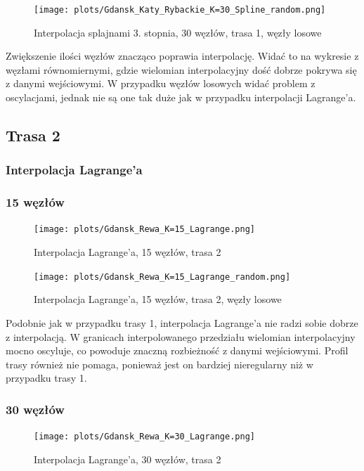 \documentclass{article}
\begin{document}
\begin{figure}[H]
    \centering
    \texttt{[image: plots/Gdansk\_Katy\_Rybackie\_K=30\_Spline\_random.png]}
    \caption{Interpolacja splajnami 3. stopnia, 30 węzłów, trasa 1, węzły losowe}
\end{figure}

Zwiększenie ilości węzłów znacząco poprawia interpolację. Widać to na wykresie z węzłami równomiernymi,
gdzie wielomian interpolacyjny dość dobrze pokrywa się z danymi wejściowymi. W przypadku węzłów losowych
widać problem z oscylacjami, jednak nie są one tak duże jak w przypadku interpolacji Lagrange'a.


\subsection{Trasa 2}

\subsubsection{Interpolacja Lagrange'a}

\subsubsection*{\hfil 15 węzłów \hfil }

\begin{figure}[H]
    \centering
    \texttt{[image: plots/Gdansk\_Rewa\_K=15\_Lagrange.png]}
    \caption{Interpolacja Lagrange'a, 15 węzłów, trasa 2}
\end{figure}

\begin{figure}[H]
    \centering
    \texttt{[image: plots/Gdansk\_Rewa\_K=15\_Lagrange\_random.png]}
    \caption{Interpolacja Lagrange'a, 15 węzłów, trasa 2, węzły losowe}
\end{figure}

Podobnie jak w przypadku trasy 1, interpolacja Lagrange'a nie radzi sobie dobrze z interpolacją.
W granicach interpolowanego przedziału wielomian interpolacyjny mocno oscyluje, co powoduje
znaczną rozbieżność z danymi wejściowymi. Profil trasy również nie pomaga, ponieważ jest on
bardziej nieregularny niż w przypadku trasy 1.

\subsubsection*{\hfil 30 węzłów \hfil }

\begin{figure}[H]
    \centering
    \texttt{[image: plots/Gdansk\_Rewa\_K=30\_Lagrange.png]}
    \caption{Interpolacja Lagrange'a, 30 węzłów, trasa 2}
\end{figure}
\end{document}

